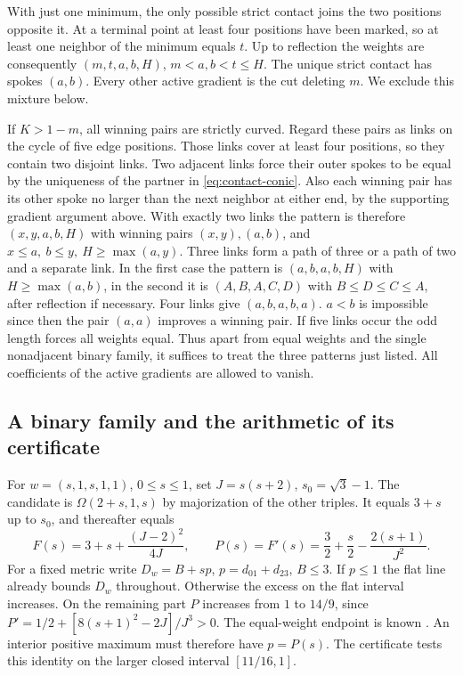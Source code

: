 \documentclass[11pt,a4paper]{article}
\theoremstyle{definition}
\begin{document}
With just one minimum, the only possible strict contact joins the two
positions opposite it. At a terminal point at least four positions have
been marked, so at least one neighbor of the minimum equals $t$. Up to
reflection the weights are consequently $(m,t,a,b,H)$, $m<a,b<t\le H$.
The unique strict contact has spokes $(a,b)$. Every other active gradient
is the cut deleting $m$. We exclude this mixture below.

If $K>1-m$, all winning pairs are strictly curved. Regard these
pairs as links on the cycle of five edge positions. Those links cover
at least four positions, so they contain two disjoint links. Two adjacent
links force their outer spokes to be equal by the uniqueness of the
partner in \eqref{eq:contact-conic}. Also each winning pair has its other
spoke no larger than the next neighbor at either end, by the supporting
gradient argument above. With exactly two links the pattern is therefore
$(x,y,a,b,H)$ with winning pairs $(x,y),(a,b)$, and
$x\le a,\ b\le y,\ H\ge\max(a,y)$. Three links form a path of three
or a path of two and a separate link. In the first case the pattern is
$(a,b,a,b,H)$ with $H\ge\max(a,b)$, in the second it is $(A,B,A,C,D)$
with $B\le D\le C\le A$, after reflection if necessary. Four links give
$(a,b,a,b,a)$. $a<b$ is impossible since then the pair $(a,a)$ improves
a winning pair. If five links occur the odd length forces all weights
equal. Thus apart from equal weights and the single nonadjacent binary
family, it suffices to treat the three patterns just listed. All
coefficients of the active gradients are allowed to vanish.

\subsection{A binary family and the arithmetic of its certificate}

For $w=(s,1,s,1,1)$, $0\le s\le1$, set $J=s(s+2)$, $s_0=\sqrt3-1$.
The candidate is $\Omega(2+s,1,s)$ by majorization of the other triples.
It equals $3+s$ up to $s_0$, and thereafter equals
\[
 F(s)=3+s+\frac{(J-2)^2}{4J},\qquad
 P(s)=F'(s)=\frac32+\frac s2-\frac{2(s+1)}{J^2}.
\]
For a fixed metric write $D_w=B+sp$, $p=d_{01}+d_{23}$, $B\le3$.
If $p\le1$ the flat line already bounds $D_w$ throughout. Otherwise
the excess on the flat interval increases. On the remaining part $P$
increases from $1$ to $14/9$, since
$P'=1/2+[8(s+1)^2-2J]/J^3>0$. The equal-weight endpoint is known
\cite{Jiang}. An interior positive maximum must therefore have $p=P(s)$.
The certificate tests this identity on the larger closed interval
$[11/16,1]$.
\end{document}
